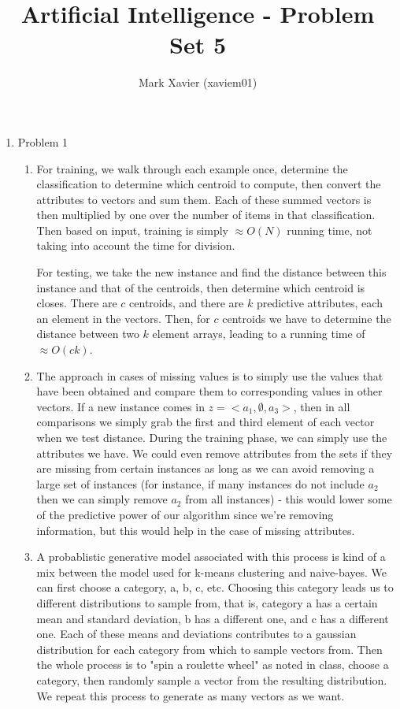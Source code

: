 \documentclass{article}
\title{Artificial Intelligence - Problem Set 5}
\author{Mark Xavier (xaviem01)}
\begin{document}
	\maketitle
	
	\begin{enumerate}
		\item Problem 1
		\begin{enumerate}
			\item For training, we walk through each example once, determine the classification to determine which centroid to compute, then convert the attributes to vectors and sum them.  Each of these summed vectors is then multiplied by one over the number of items in that classification.  Then based on input, training is simply $\approx O(N)$ running time, not taking into account the time for division.
			
			For testing, we take the new instance and find the distance between this instance and that of the centroids, then determine which centroid is closes.  There are $c$ centroids, and there are $k$ predictive attributes, each an element in the vectors.  Then, for $c$ centroids we have to determine the distance between two $k$ element arrays, leading to a running time of $\approx O(ck)$.
			
			\item The approach in cases of missing values is to simply use the values that have been obtained and compare them to corresponding values in other vectors.  If a new instance comes in $z = <a_1, \emptyset, a_3>$, then in all comparisons we simply grab the first and third element of each vector when we test distance.  During the training phase, we can simply use the attributes we have.  We could even remove attributes from the sets if they are missing from certain instances as long as we can avoid removing a large set of instances (for instance, if many instances do not include $a_2$ then we can simply remove $a_2$ from all instances) - this would lower some of the predictive power of our algorithm since we're removing information, but this would help in the case of missing attributes.
			
			\item A probablistic generative model associated with this process is kind of a mix between the model used for k-means clustering and naive-bayes.  We can first choose a category, a, b, c, etc.  Choosing this category leads us to different distributions to sample from, that is, category a has a certain mean and standard deviation, b has a different one, and c has a different one.  Each of these means and deviations contributes to a gaussian distribution for each category from which to sample vectors from.  Then the whole process is to "spin a roulette wheel" as noted in class, choose a category, then randomly sample a vector from the resulting distribution.  We repeat this process to generate as many vectors as we want.
			

\end{enumerate}
\end{enumerate}
\end{document}
